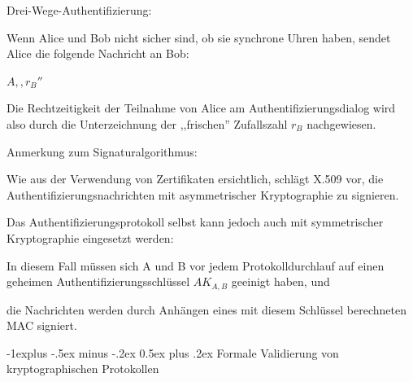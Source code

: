 \documentclass[a4paper]{article}
\makeatletter
\renewcommand{\subsection}{\@startsection{subsection}{2}{0mm}%
 {-1explus -.5ex minus -.2ex}%
 {0.5ex plus .2ex}%
 {\normalfont\normalsize\bfseries}}
\makeatother
\begin{document}
\begin{multicols}{3}
\begin{itemize*}
            \item Drei-Wege-Authentifizierung:
            \begin{itemize*}
                  \item Wenn Alice und Bob nicht sicher sind, ob sie synchrone Uhren haben, sendet Alice die folgende Nachricht an Bob:
            \end{itemize*}
            \begin{enumerate*}
                  \def\labelenumi{\arabic{enumi}.}
                  \setcounter{enumi}{2}
                  \item $A,,r_B''$
            \end{enumerate*}
            \begin{itemize*}
                  \item Die Rechtzeitigkeit der Teilnahme von Alice am Authentifizierungsdialog wird also durch die Unterzeichnung der ,,frischen'' Zufallszahl $r_B$ nachgewiesen.
            \end{itemize*}
            \item Anmerkung zum Signaturalgorithmus:
            \begin{itemize*}
                  \item Wie aus der Verwendung von Zertifikaten ersichtlich, schlägt X.509 vor, die Authentifizierungsnachrichten mit asymmetrischer Kryptographie zu signieren.
                  \item Das Authentifizierungsprotokoll selbst kann jedoch auch mit symmetrischer Kryptographie eingesetzt werden:
                  \begin{itemize*} \item In diesem Fall müssen sich A und B vor jedem Protokolldurchlauf auf einen geheimen Authentifizierungsschlüssel $AK_{A,B}$ geeinigt haben, und \item die Nachrichten werden durch Anhängen eines mit diesem Schlüssel berechneten MAC signiert. \end{itemize*}
            \end{itemize*}
      \end{itemize*}


      \subsection{Formale Validierung von kryptographischen
            Protokollen}


\end{multicols}
\end{document}
